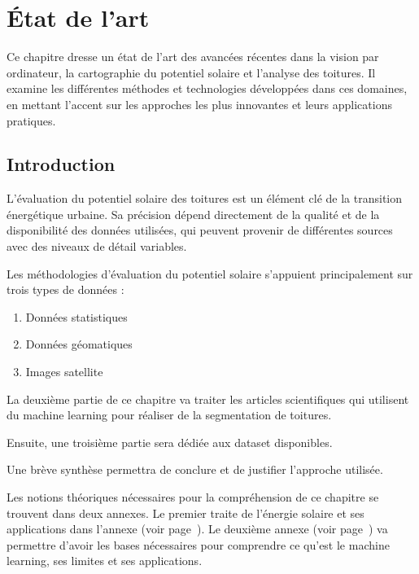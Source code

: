 
\chapter{État de l'art}
\label{chap:analysis}

Ce chapitre dresse un état de l'art des avancées récentes dans la vision par ordinateur, la cartographie du potentiel solaire et l'analyse des toitures. Il examine les différentes méthodes et technologies développées dans ces domaines, en mettant l'accent sur les approches les plus innovantes et leurs applications pratiques.

\localtableofcontents

\newpage

\section{Introduction}
\par{L'évaluation du potentiel solaire des toitures est un élément clé de la transition énergétique urbaine. Sa précision dépend directement de la qualité et de la disponibilité des données utilisées, qui peuvent provenir de différentes sources avec des niveaux de détail variables.}

\par{Les méthodologies d'évaluation du potentiel solaire s'appuient principalement sur trois types de données :}
\begin{enumerate}
    \item Données statistiques
    \item Données géomatiques
    \item Images satellite
\end{enumerate}

\par{La deuxième partie de ce chapitre va traiter les articles scientifiques qui utilisent du machine learning pour réaliser de la segmentation de toitures.}

\par{Ensuite, une troisième partie sera dédiée aux dataset disponibles.}

\par{Une brève synthèse permettra de conclure et de justifier l'approche utilisée.}

\par{Les notions théoriques nécessaires pour la compréhension de ce chapitre se trouvent dans deux annexes. Le premier traite de  l'énergie solaire et ses applications dans l'annexe \textit{} (voir page~\pageref{chap:fondamentaux_energie}). Le deuxième annexe \textit{} (voir page~\pageref{chap:fondamentaux_ml}) va permettre d’avoir les bases nécessaires pour comprendre ce qu’est le machine learning, ses
limites et ses applications.}

